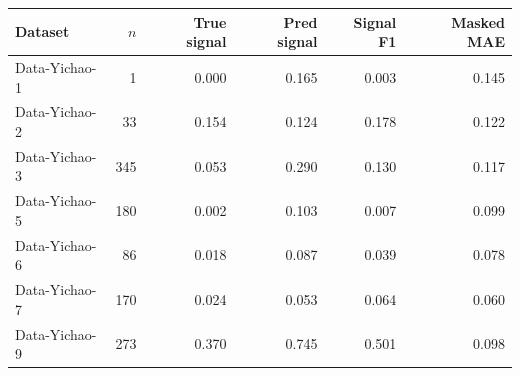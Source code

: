 \begin{tabular}{lrrrrr}
\toprule
Dataset & $n$ & True signal & Pred signal & Signal F1 & Masked MAE \\
\midrule
Data-Yichao-1 & 1 & 0.000 & 0.165 & 0.003 & 0.145 \\
Data-Yichao-2 & 33 & 0.154 & 0.124 & 0.178 & 0.122 \\
Data-Yichao-3 & 345 & 0.053 & 0.290 & 0.130 & 0.117 \\
Data-Yichao-5 & 180 & 0.002 & 0.103 & 0.007 & 0.099 \\
Data-Yichao-6 & 86 & 0.018 & 0.087 & 0.039 & 0.078 \\
Data-Yichao-7 & 170 & 0.024 & 0.053 & 0.064 & 0.060 \\
Data-Yichao-9 & 273 & 0.370 & 0.745 & 0.501 & 0.098 \\
\bottomrule
\end{tabular}
